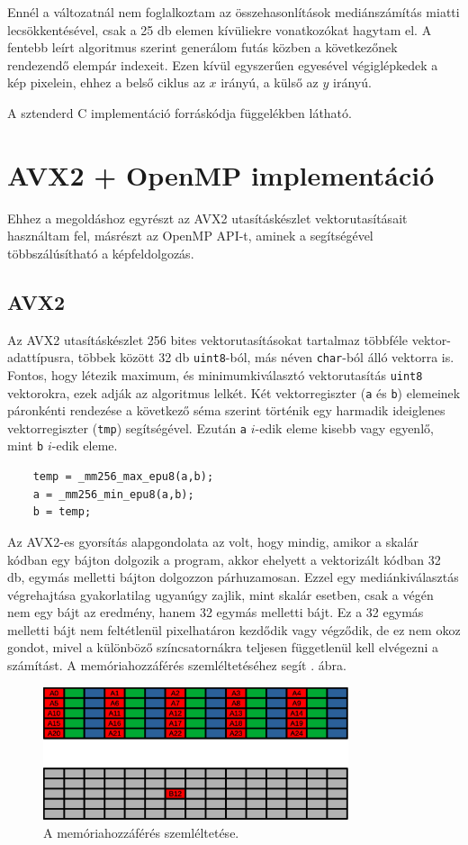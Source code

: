 		Ennél a változatnál nem foglalkoztam az összehasonlítások mediánszámítás miatti lecsökkentésével, csak a 25 db elemen kívüliekre vonatkozókat hagytam el. A fentebb leírt algoritmus szerint generálom futás közben a következőnek rendezendő elempár indexeit. Ezen kívül egyszerűen egyesével végiglépkedek a kép pixelein, ehhez a belső ciklus az $x$ irányú, a külső az $y$ irányú.
		
		A sztenderd C implementáció forráskódja  függelékben látható.

	\section{AVX2 + OpenMP implementáció}
		Ehhez a megoldáshoz egyrészt az AVX2 utasításkészlet vektorutasításait használtam fel, másrészt az OpenMP API-t, aminek a segítségével többszálúsítható a képfeldolgozás.
		\subsection{AVX2}
			Az AVX2 utasításkészlet 256 bites vektorutasításokat tartalmaz többféle vektor-adattípusra, többek között 32 db \verb|uint8|-ból, más néven \verb|char|-ból álló vektorra is. Fontos, hogy létezik maximum, és minimumkiválasztó vektorutasítás \verb|uint8| vektorokra, ezek adják az algoritmus lelkét. Két vektorregiszter (\verb|a| és \verb|b|) elemeinek páronkénti rendezése a következő séma szerint történik egy harmadik ideiglenes vektorregiszter (\verb|tmp|) segítségével. Ezután \verb|a| $i$-edik eleme kisebb vagy egyenlő, mint \verb|b| $i$-edik eleme.
			\begin{lstlisting}
	temp = _mm256_max_epu8(a,b);
	a = _mm256_min_epu8(a,b);
	b = temp;\end{lstlisting}

			Az AVX2-es gyorsítás alapgondolata az volt, hogy mindig, amikor a skalár kódban egy bájton dolgozik a program, akkor ehelyett a vektorizált kódban 32 db, egymás melletti bájton dolgozzon párhuzamosan. Ezzel egy mediánkiválasztás végrehajtása gyakorlatilag ugyanúgy zajlik, mint skalár esetben, csak a végén nem egy bájt az eredmény, hanem 32 egymás melletti bájt. Ez a 32 egymás melletti bájt nem feltétlenül pixelhatáron kezdődik vagy végződik, de ez nem okoz gondot, mivel a különböző színcsatornákra teljesen függetlenül kell elvégezni a számítást. A memóriahozzáférés szemléltetéséhez segít . ábra.

			\begin{figure}[h]
				\centering
				\includegraphics[width=0.8\textwidth]{kep/vektorolvasas.eps}
				\caption{A memóriahozzáférés szemléltetése.}
				\label{fig:vektorolvasas}
			\end{figure}

